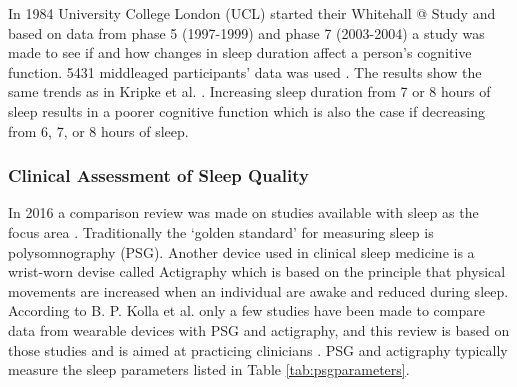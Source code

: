 \documentclass[12pt]{article} %
\makeatletter
\newcommand*{\rom}[1]{\expandafter\@slowromancap\romannumeral #1@}
\makeatother
\begin{document}
In 1984 University College London (UCL) started their Whitehall \rom{2} Study and based on data from phase 5 (1997-1999) and phase 7 (2003-2004) a study was made to see if and how changes in sleep duration affect a person's cognitive function. 5431 middleaged participants' data was used \cite{cognitive}. The results show the same trends as in Kripke et al. \cite{arch}. Increasing sleep duration from 7 or 8 hours of sleep results in a poorer cognitive function which is also the case if decreasing from 6, 7, or 8 hours of sleep. 

\subsubsection{Clinical Assessment of Sleep Quality}
In 2016 a comparison review was made on studies available with sleep as the focus area \cite{consumer}. Traditionally the `golden standard' for measuring sleep is polysomnography (PSG). Another device used in clinical sleep medicine is a wrist-worn devise called Actigraphy which is based on the principle that physical movements are increased when an individual are awake and reduced during sleep. According to B. P. Kolla et al. only a few studies have been made to compare data from wearable devices with PSG and actigraphy, and this review is based on those studies and is aimed at practicing clinicians \cite{consumer}. PSG and actigraphy typically measure the sleep parameters listed in Table \ref{tab:psgparameters}. 
\end{document}
